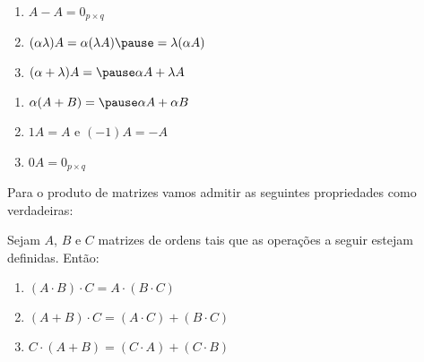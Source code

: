 \documentclass{beamer}
\begin{document}
    \begin{frame}
        \begin{proposicao}
            \begin{enumerate}[label={\roman*})]
                \conti
                \item $A - A = 0_{p \times q}$\pause
                \item $(\alpha\lambda) A = \alpha(\lambda A) \pause = \lambda(\alpha A)$\pause
                \item $(\alpha + \lambda)A = \pause \alpha A + \lambda A$
                \seti
            \end{enumerate}
        \end{proposicao}
    \end{frame}

    \begin{frame}
        \begin{proposicao}
            \begin{enumerate}[label={\roman*})]
                \conti
                \item $\alpha(A + B) = \pause \alpha A + \alpha B$\pause
                \item $1A = A$ e $(-1)A = -A$\pause
                \item  $0A = 0_{p \times q}$
            \end{enumerate}
        \end{proposicao}
    \end{frame}

    \begin{frame}
        Para o produto de matrizes vamos admitir as seguintes propriedades como verdadeiras:\pause
        \begin{proposicao}
            Sejam $A$, $B$ e $C$ \pause matrizes de ordens tais que as operações a seguir estejam definidas. Ent\~ao:\pause
                \begin{enumerate}[label={\roman*})]
                    \item $(A\cdot B)\cdot C = A\cdot(B \cdot C)$\pause
                    \item $(A + B)\cdot C = (A\cdot C) + (B\cdot C)$\pause
                    \item $C\cdot(A + B) = (C\cdot A) + (C\cdot B)$
                    \seti
                \end{enumerate}
        \end{proposicao}
    \end{frame}
\end{document}
